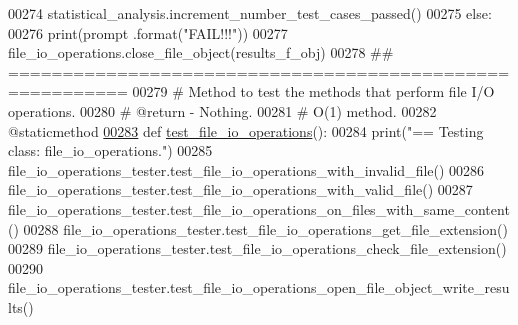 \begin{DoxyCode}
00274             statistical\_analysis.increment\_number\_test\_cases\_passed()
00275         \textcolor{keywordflow}{else}:
00276             print(prompt .format(\textcolor{stringliteral}{"FAIL!!!"}))
00277         file\_io\_operations.close\_file\_object(results\_f\_obj)
00278     \textcolor{comment}{## =========================================================}
00279     \textcolor{comment}{#   Method to test the methods that perform file I/O operations.}
00280     \textcolor{comment}{#   @return - Nothing.}
00281     \textcolor{comment}{#   O(1) method.}
00282     @staticmethod
\hypertarget{file__io__tester_8py_source_l00283}{}\hyperlink{classutilities_1_1file__io__tester_1_1file__io__operations__tester_a874961b1543ff59a1b1ea4b40abca8d2}{00283}     \textcolor{keyword}{def }\hyperlink{classutilities_1_1file__io__tester_1_1file__io__operations__tester_a874961b1543ff59a1b1ea4b40abca8d2}{test\_file\_io\_operations}():
00284         print(\textcolor{stringliteral}{"==   Testing class: file\_io\_operations."})
00285         file\_io\_operations\_tester.test\_file\_io\_operations\_with\_invalid\_file()
00286         file\_io\_operations\_tester.test\_file\_io\_operations\_with\_valid\_file()
00287         file\_io\_operations\_tester.test\_file\_io\_operations\_on\_files\_with\_same\_content()
00288         file\_io\_operations\_tester.test\_file\_io\_operations\_get\_file\_extension()
00289         file\_io\_operations\_tester.test\_file\_io\_operations\_check\_file\_extension()
00290         file\_io\_operations\_tester.test\_file\_io\_operations\_open\_file\_object\_write\_results()
\end{DoxyCode}
